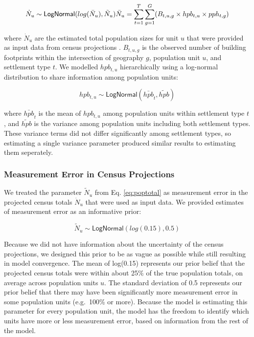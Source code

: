 \documentclass[]{book}
\begin{document}
\begin{equation}
\dot{N}_u \sim \textsf{LogNormal}(log(\bar{N}_u), \tilde{N}_u) \\
\bar{N}_u = \sum_{t=1}^{T} \sum_{g=1}^{G} (B_{t,u,g} \times hpb_{t,u} \times pph_{t,g})
\label{eq:poptotal}
\end{equation}

where \(\dot{N}_u\) are the estimated total population sizes for unit
\(u\) that were provided as input data from census projections
\citep{worldpop2018globala}. \(B_{t,u,g}\) is the observed number of
building footprints within the intersection of geography \(g\),
population unit \(u\), and settlement type \(t\). We modelled
\(hpb_{t,u}\) hierarchically using a log-normal distribution to share
information among population units:

\begin{equation}
hpb_{t,u} \sim \textsf{LogNormal}(\bar{hpb}_{t}, \tilde{hpb})
\end{equation}

where \(\bar{hpb}_{t}\) is the mean of \(hpb_{t,u}\) among population
units within settlement type \(t\), and \(\tilde{hpb}\) is the variance
among population units including both settlement types. These variance
terms did not differ significantly among settlement types, so estimating
a single variance parameter produced similar results to estimating them
seperately.

\subsubsection*{Measurement Error in Census
Projections}\label{measurement-error-in-census-projections}

We treated the parameter \(\tilde{N}_u\) from Eq. \eqref{eq:poptotal} as
measurement error in the projected census totals \(\dot{N}_u\) that were
used as input data. We provided estimates of measurement error as an
informative prior:

\begin{equation}
\tilde{N}_u \sim \textsf{LogNormal}(log(0.15), 0.5)
\end{equation}

Because we did not have information about the uncertainty of the census
projections, we designed this prior to be as vague as possible while
still resulting in model convergence. The mean of log(0.15) represents
our prior belief that the projected census totals were within about 25\%
of the true population totals, on average across population units \(u\).
The standard deviation of 0.5 represents our prior belief that there may
have been significantly more measurement error in some population units
(e.g.~100\% or more). Because the model is estimating this parameter for
every population unit, the model has the freedom to identify which units
have more or less measurement error, based on information from the rest
of the model.
\end{document}

